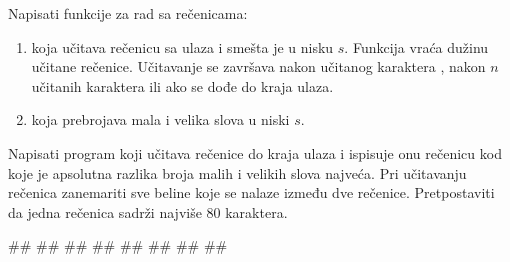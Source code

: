 \begin{Exercise}[difficulty=1, label=NIS_20] 
Napisati funkcije za rad sa rečenicama:
\begin{enumerate}
\setlength\itemsep{0em}
\item {} koja učitava rečenicu sa ulaza i smešta je u nisku $s$. 
Funkcija vraća dužinu učitane rečenice. Učitavanje se završava nakon učitanog karaktera , nakon $n$ učitanih karaktera ili ako
se dođe do kraja ulaza.
\item {} koja prebrojava mala i velika slova u niski $s$.
\end{enumerate}
 Napisati program koji učitava rečenice do kraja ulaza i ispisuje onu rečenicu kod koje je apsolutna razlika broja malih i velikih slova najveća.
 Pri učitavanju rečenica zanemariti sve beline koje se nalaze između dve rečenice. 
Pretpostaviti da jedna rečenica sadrži najviše 80 karaktera.

\begin{maxitest}
\begin{upotreba}{1}
#\naslovInt#
##
##
##
##
##
##
##
\end{upotreba}
\end{maxitest}

\end{Exercise}
\ifresenja
\begin{Answer}[ref=NIS_20]
\end{Answer}
\fi



